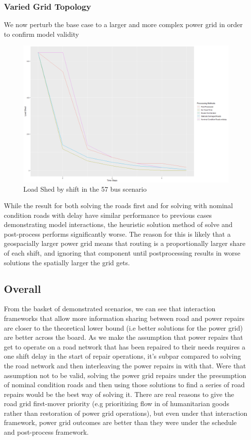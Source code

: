 \documentclass{article}
\begin{document}
	\subsubsection{Varied Grid Topology}
	We now perturb the base case to a larger and more complex power grid in order to confirm model validity 
	\begin{figure}[H]
		\centering
		\includegraphics[width=.9\linewidth]{Rplot57.png}
		\caption{Load Shed by shift in the 57 bus scenario}
		\label{fig:sub2}
		
		
	\end{figure}
	
	While the result for both solving the roads first and for solving with nominal condition roads with delay have similar performance to previous cases demonstrating model interactions, the heuristic solution method of solve and post-process performs significantly worse. The reason for this is likely that a geospacially larger power grid means that routing is a proportionally larger share of each shift, and ignoring that component until postprocessing results in worse solutions the spatially larger the grid gets.
	
	\subsection{Overall}
	From the basket of demonstrated scenarios, we can see that interaction frameworks that allow more information sharing between road and power repairs are closer to the theoretical lower bound (i.e better solutions for the power grid) are better across the board. As we make the assumption that power repairs that get to operate on a road network that has been repaired to their needs requires a one shift delay in the start of repair operations, it's subpar compared to solving the road network and then interleaving the power repairs in with that. Were that assumption not to be valid, solving the power grid repairs under the presumption of nominal condition roads and then using those solutions to find a series of road repairs would be the best way of solving it. There are real reasons to give the road grid first-mover priority (e.g prioritizing flow in of humanitarian goods rather than restoration of power grid operations), but even under that interaction framework, power grid outcomes are better than they were under the schedule and post-process framework.
\end{document}
